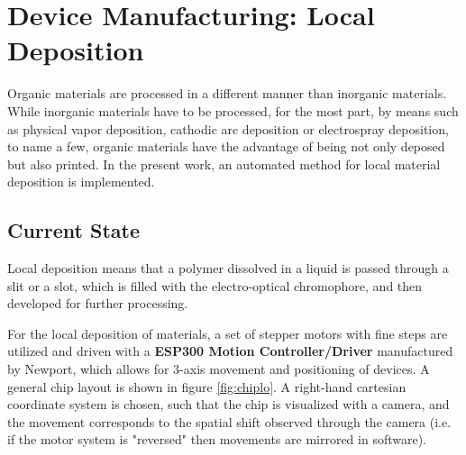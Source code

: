 

\chapter{Device Manufacturing: Local Deposition}
\label{ch:ew}
Organic materials are processed in a different manner than inorganic materials. While inorganic materials have to be processed, for the most part, by means such as physical vapor deposition, cathodic arc deposition or electrospray deposition, to name a few, organic materials have the advantage of being not only deposed but also printed. In the present work, an automated method for local material deposition is implemented. 

\section{Current State}

Local deposition means that a polymer dissolved in a liquid is passed through a slit or a slot, which is filled with the electro-optical chromophore, and then developed for further processing.

For the local deposition of materials, a set of stepper motors with fine steps are utilized and driven with a \textbf{ESP300 Motion Controller/Driver} manufactured by Newport, which allows for 3-axis movement and positioning of devices. A general chip layout is shown in figure \ref{fig:chiplo}. A right-hand cartesian coordinate system is chosen, such that the chip is visualized with a camera, and the movement corresponds to the spatial shift observed through the camera (i.e. if the motor system is "reversed" then movements are mirrored in software).  \par\medskip

